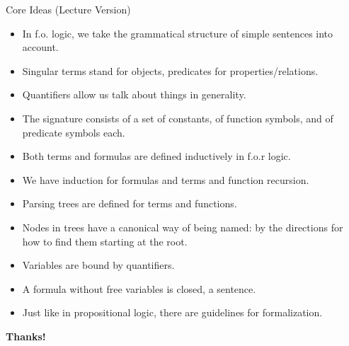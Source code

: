 \begin{frame}{Core Ideas (Lecture Version)}

	\begin{itemize}
	
		\item In f.o. logic, we take the grammatical structure of simple sentences into account.
		
		\item  Singular terms stand for objects, predicates for properties/relations.
		
		\item Quantifiers allow us talk about things in generality.
		
		\item The signature consists of a set of constants, of function symbols, and of predicate symbols each.
		
		\item Both terms and formulas are defined inductively in f.o.r logic.
		
		\item We have induction for formulas and terms and function recursion.
		
		\item Parsing trees are defined for terms and functions.
		
		\item Nodes in trees have a canonical way of being named: by the directions for how to find them starting at the root. 
		
		\item Variables are bound by quantifiers.
		
		\item A formula without free variables is closed, a sentence.
		
		\item Just like in propositional logic, there are guidelines for formalization.
					
	\end{itemize}

\end{frame}


\begin{frame}

	\begin{center}
	{\huge\bf Thanks!}
	\end{center}

\end{frame}


